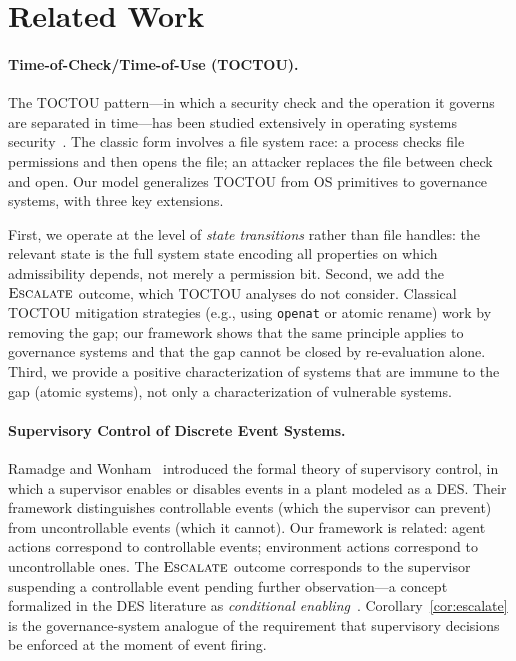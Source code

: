 \documentclass[11pt]{article}
\theoremstyle{plain}
\theoremstyle{definition}
\theoremstyle{remark}
\newcommand{\Escalate}{\textsc{Escalate}}
\begin{document}
\section{Related Work}
\label{sec:related}

\paragraph{Time-of-Check/Time-of-Use (TOCTOU).}
The TOCTOU pattern---in which a security check and the operation it governs
are separated in time---has been studied extensively in operating systems
security~\cite{bishop96, tsafrir08}.  The classic form involves a file system
race: a process checks file permissions and then opens the file; an attacker
replaces the file between check and open.  Our model generalizes TOCTOU from
OS primitives to governance systems, with three key extensions.

First, we operate at the level of \emph{state transitions} rather than file
handles: the relevant state is the full system state encoding all properties
on which admissibility depends, not merely a permission bit.  Second, we add
the $\Escalate$ outcome, which TOCTOU analyses do not consider.  Classical
TOCTOU mitigation strategies (e.g., using \texttt{openat} or atomic
rename) work by removing the gap; our framework shows that the same principle
applies to governance systems and that the gap cannot be closed by
re-evaluation alone.  Third, we provide a positive characterization of systems
that are immune to the gap (atomic systems), not only a characterization of
vulnerable systems.

\paragraph{Supervisory Control of Discrete Event Systems.}
Ramadge and Wonham~\cite{ramadge87} introduced the formal theory of
supervisory control, in which a supervisor enables or disables events in a
plant modeled as a DES.  Their framework distinguishes controllable events
(which the supervisor can prevent) from uncontrollable events (which it
cannot).  Our framework is related: agent actions correspond to controllable
events; environment actions correspond to uncontrollable ones.  The
$\Escalate$ outcome corresponds to the supervisor suspending a controllable
event pending further observation---a concept formalized in the DES literature
as \emph{conditional enabling}~\cite{ramadge87}.  Corollary~\ref{cor:escalate}
is the governance-system analogue of the requirement that supervisory
decisions be enforced at the moment of event firing.
\end{document}
